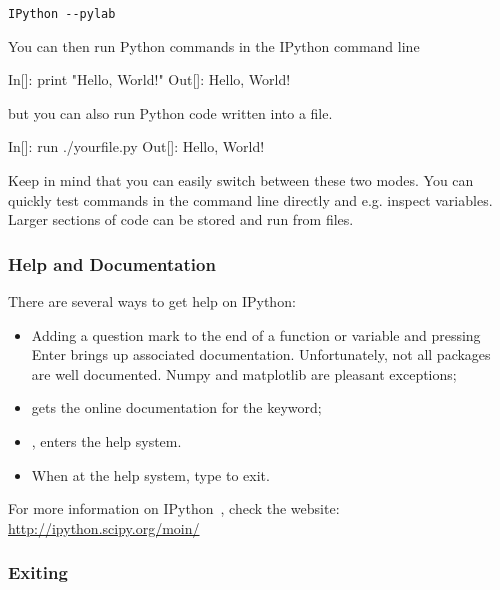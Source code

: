 \begin{description}
\begin{verbatim}
IPython --pylab
\end{verbatim}

You can then run Python commands in the IPython command line

\begin{python}
 In[]: print "Hello, World!"
Out[]: Hello, World!
\end{python}

but you can also run Python code written into a file.

\begin{python}
 In[]: run ./yourfile.py
Out[]: Hello, World!
\end{python}
\end{description}





Keep in mind that you can easily switch between these two modes. You can quickly test commands in the command line directly and e.g. inspect variables. Larger sections of code can be stored and run from files.

\subsubsection{Help and Documentation}

There are several ways to get help on IPython:

\begin{itemize}
\item Adding a question mark to the end of a function or variable and pressing Enter brings up associated documentation. Unfortunately, not all packages are well documented. Numpy and matplotlib are pleasant exceptions;
\item {} gets the online documentation for the  keyword;
\item {}, enters the help system.
\item When at the help system, type  to exit.
\end{itemize}

\noindent For more information on IPython~\citep{PER-GRA:2007}, check the website: \url{http://ipython.scipy.org/moin/}

\subsubsection{Exiting}

